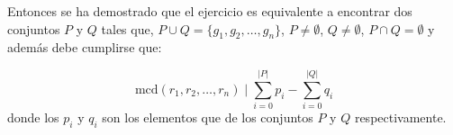 \documentclass{article}
\begin{document}
Entonces se ha demostrado que el ejercicio es equivalente a encontrar dos conjuntos $P$ y $Q$ tales que, $P \cup Q =\{g_1,g_2, \ldots, g_n\}$,
$P \neq \emptyset $, $Q \neq \emptyset$, $P \cap Q=\emptyset$ y además debe cumplirse que:

\begin{equation}
    \text{mcd}(r_1,r_2,\ldots ,r_n) \mid \sum_{i=0}^{|P|} p_i - \sum_{i=0}^{|Q|} q_i
\end{equation}
donde los $p_i$ y $q_i$ son los elementos que de los conjuntos $P$ y $Q$ respectivamente.
\end{document}
